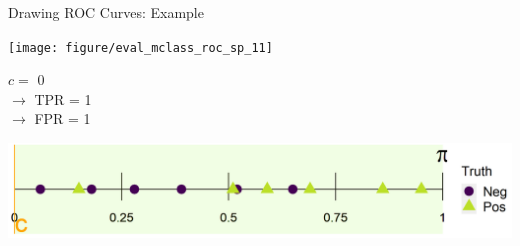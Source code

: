 
\begin{vbframe}{Drawing ROC Curves: Example}
	
	\begin{knitrout}\scriptsize
		\color{fgcolor}
		
		{
			\texttt{[image: figure/eval\_mclass\_roc\_sp\_11]}
		}
		
	\end{knitrout}
	
	\vfill
	
	\begin{minipage}[b]{0.3\textwidth}
		$c =$ 0\\ 
		$\rightarrow$ TPR = 1 \\
		$\rightarrow$ FPR = 1
	\end{minipage}%
	\begin{minipage}[b]{0.7\textwidth}
		\includegraphics{figure/roc_horizontal_step_7} 
	\end{minipage}
	
\end{vbframe}


